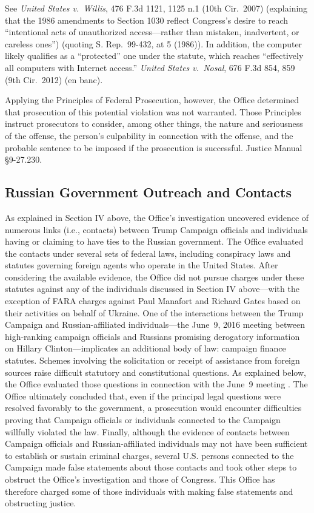 See \textit{United States v.\ Willis}, 476 F.3d 1121, 1125 n.1 (10th Cir.~2007) (explaining that the 1986 amendments to Section 1030 reflect Congress's desire to reach ``intentional acts of unauthorized access---rather than mistaken, inadvertent, or careless ones'') (quoting S. Rep.~99-432, at 5 (1986)).
In addition, the computer  likely qualifies as a ``protected'' one under the statute, which reaches ``effectively all computers with Internet access.''
\textit{United States v.\ Nosal}, 676 F.3d 854, 859 (9th Cir.~2012) (en banc).

Applying the Principles of Federal Prosecution, however, the Office determined that prosecution of this potential violation was not warranted.
Those Principles instruct prosecutors to consider, among other things, the nature and seriousness of the offense, the person's culpability in connection with the offense, and the probable sentence to be imposed if the prosecution is successful.
Justice Manual \S 9-27.230. 

\subsection{Russian Government Outreach and Contacts}
As explained in Section IV above, the Office's investigation uncovered evidence of numerous links (i.e., contacts) between Trump Campaign officials and individuals having or claiming to have ties to the Russian government.
The Office evaluated the contacts under several sets of federal laws, including conspiracy laws and statutes governing foreign agents who operate in the United States.
After considering the available evidence, the Office did not pursue charges under these statutes against any of the individuals discussed in Section IV above---with the exception of FARA charges against Paul Manafort and Richard Gates based on their activities on behalf of Ukraine.
One of the interactions between the Trump Campaign and Russian-affiliated individuals---the June~9, 2016 meeting between high-ranking campaign officials and Russians promising derogatory information on Hillary Clinton---implicates an additional body of law: campaign finance statutes.
Schemes involving the solicitation or receipt of assistance from foreign sources raise difficult statutory and constitutional questions.
As explained below, the Office evaluated those questions in connection with the June~9 meeting .
The Office ultimately concluded that, even if the principal legal questions were resolved favorably to the government, a prosecution would encounter difficulties proving that Campaign officials or individuals connected to the Campaign willfully violated the law.
Finally, although the evidence of contacts between Campaign officials and Russian-affiliated individuals may not have been sufficient to establish or sustain criminal charges, several U.S. persons connected to the Campaign made false statements about those contacts and took other steps to obstruct the Office's investigation and those of Congress.
This Office has therefore charged some of those individuals with making false statements and obstructing justice.

